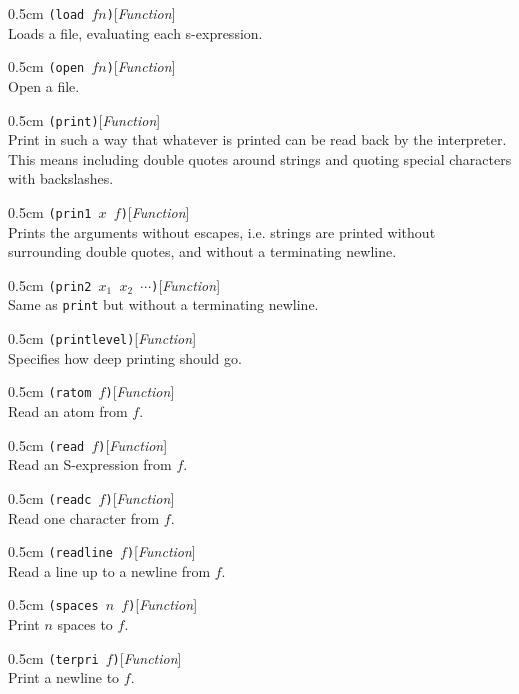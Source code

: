 \documentclass[a4paper]{article}
\newcommand{\lisp}[1]{\texttt{#1}}
\newcommand{\xargs}{$x_{1}$ $x_{2}$ $\cdots$}
\newenvironment{defun}[2]{\begin{adjustwidth}{0.5cm}{}
    {\hspace*{-0.5cm}\lisp{#2}\hfill[\textit{#1}]\\}}
               {\end{adjustwidth}}
\begin{document}
\begin{defun}{Function}{(load $fn$)}
  Loads a file, evaluating each s-expression.
\end{defun}

\begin{defun}{Function}{(open $fn$)}
  Open a file.
\end{defun}

\begin{defun}{Function}{(print)}
  Print in such a way that whatever is printed can be read back by the
  interpreter. This means including double quotes around strings and
  quoting special characters with backslashes.
\end{defun}


\begin{defun}{Function}{(prin1 $x$ $f$)}
  Prints the arguments without escapes, i.e. strings are printed
  without surrounding double quotes, and without a terminating
  newline.
\end{defun}

\begin{defun}{Function}{(prin2 \xargs)}
  Same as \lisp{print} but without a terminating newline.
\end{defun}

\begin{defun}{Function}{(printlevel)}
  Specifies how deep printing should go.
\end{defun}

\begin{defun}{Function}{(ratom $f$)}
  Read an atom from $f$.
\end{defun}

\begin{defun}{Function}{(read $f$)}
  Read an S-expression from $f$.
\end{defun}

\begin{defun}{Function}{(readc $f$)}
  Read one character from $f$.
\end{defun}

\begin{defun}{Function}{(readline $f$)}
  Read a line up to a newline from $f$.
\end{defun}

\begin{defun}{Function}{(spaces $n$ $f$)}
  Print $n$ spaces to $f$.
\end{defun}

\begin{defun}{Function}{(terpri $f$)}
  Print a newline to $f$.
\end{defun}
\end{document}
